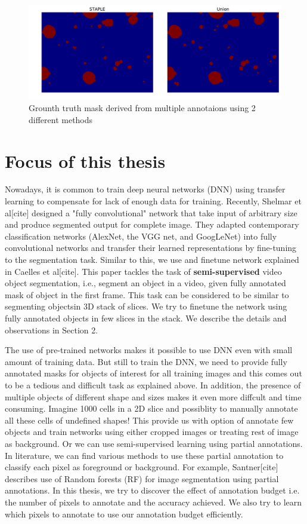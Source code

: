 \begin{figure}[] \label{fig:ref}
 \includegraphics[width=0.7\linewidth]{figures/staple.pdf}
\caption{Grounth truth mask derived from multiple annotaions using 2 different methods}
\end{figure}

\section{Focus of this thesis}
Nowadays, it is common to train deep neural networks (DNN) using transfer learning to compensate for lack of enough data for training. Recently, Shelmar et al[cite] designed a "fully convolutional" network that take input of arbitrary size and produce segmented output for complete image. They adapted contemporary classification networks (AlexNet, the VGG net, and GoogLeNet) into fully convolutional networks and transfer their learned representations by fine-tuning to the segmentation task. Similar to this, we use and finetune network explained in Caelles et al[cite]. This paper tackles the task of \textbf{semi-supervised} video object segmentation, i.e., segment an object in a video, given fully annotated mask of object in the first frame. This task can be considered to be similar to segmenting objectsin 3D stack of slices. We try to finetune the network using fully annotated objects in few slices in the stack. We describe the details and observations in Section 2.

The use of pre-trained networks makes it possible to use DNN even with small amount of training data. But still to train the DNN, we need to provide fully annotated masks for objects of interest for all training images and this comes out to be a tedious and difficult task as explained above. In addition, the presence of multiple objects of different shape and sizes makes it even more diffcult and time consuming. Imagine 1000 cells in a 2D slice and possiblity to manually annotate all these cells of undefined shapes! This provide us with option of annotate few objects and train networks using either cropped images or treating rest of image as background. Or we can use semi-supervised learning using partial annotations. In literature, we can find various methods to use these partial annotation to classify each pixel as foreground or background. For example, Santner[cite] describes use of Random forests (RF) for image segmentation using partial annotations. In this thesis, we try to discover the effect of annotation budget i.e. the number of pixels to annotate and the accuracy achieved. We also try to learn which pixels to annotate to use our annotation budget efficiently. 

